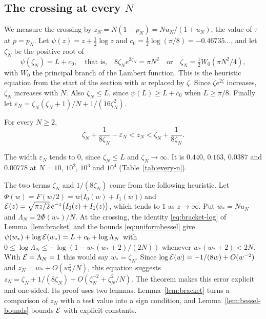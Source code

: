 \subsection{The crossing at every \texorpdfstring{$N$}{N}}\label{sec:every-n-sub}

We measure the crossing by $z_N=N(1-p_N)=Nu_N/(1+u_N)$, the value of $\tau$ at
$p=p_N$. Let $\psi(z)=z+\frac12\log z$ and $c_0=\frac12\log(\pi/8)=-0.46735\ldots$,
and let $\zeta_N$ be the positive root of
\begin{equation}\label{eq:zetaN}
\psi(\zeta_N)=L+c_0,\quad\text{that is,}\quad 8\zeta_Ne^{2\zeta_N}=\pi N^2
\quad\text{or}\quad\zeta_N=\tfrac12W_0(\pi N^2/4),
\end{equation}
with $W_0$ the principal branch of the Lambert function. This is the
heuristic equation from the start of the section with $w$ replaced by $\zeta$.
Since $\zeta e^{2\zeta}$ increases, $\zeta_N$ increases with $N$. Also
$\zeta_N\le L$, since $\psi(L)\ge L+c_0$ when $L\ge\pi/8$. Finally let
$\varepsilon_N=\zeta_N(\zeta_N+1)/N+1/(16\zeta_N^2)$.

\begin{theorem}\label{thm:every-n}
For every $N\ge2$,
\[
\zeta_N+\frac1{8\zeta_N}-\varepsilon_N<z_N<\zeta_N+\frac1{8\zeta_N}.
\]
\end{theorem}

The width $\varepsilon_N$ tends to $0$, since $\zeta_N\le L$ and
$\zeta_N\to\infty$. It is $0.440$, $0.163$, $0.0387$ and $0.00778$ at
$N=10$, $10^2$, $10^3$ and $10^4$ (Table~\ref{tab:every-n}).

The two terms $\zeta_N$ and $1/(8\zeta_N)$ come from the following heuristic.
Let
$\Phi(w)=F(w/2)=w\bigl(I_0(w)+I_1(w)\bigr)$ and
$\mathcal E(z)=\sqrt{\pi z/2}\,e^{-z}\bigl(I_0(z)+I_1(z)\bigr)$, which tends to $1$ as
$z\to\infty$. Put $w_*=Nu_N$ and $\Lambda_N=2\Phi(w_*)/N$. At the crossing, the identity
\eqref{eq:bracket-log} of Lemma~\ref{lem:bracket} and the bounds
\eqref{eq:uniformbessel} give
$\psi(w_*)+\log \mathcal E(w_*)=L+c_0+\log\Lambda_N$ with
$0\le\log\Lambda_N\le-\log(1-w_*(w_*+2)/(2N))$ whenever $w_*(w_*+2)<2N$. With $\mathcal E=\Lambda_N=1$ this
would say $w_*=\zeta_N$. Since $\log \mathcal E(w)=-1/(8w)+O(w^{-2})$ and
$z_N=w_*+O(w_*^2/N)$, this equation suggests
$z_N=\zeta_N+1/(8\zeta_N)+O(\zeta_N^{-2}+\zeta_N^2/N)$. The theorem makes this
error explicit and one-sided. Its proof uses two lemmas. Lemma~\ref{lem:bracket}
turns a comparison of $z_N$ with a test value into a sign condition, and
Lemma~\ref{lem:bessel-bounds} bounds $\mathcal E$ with explicit constants.

